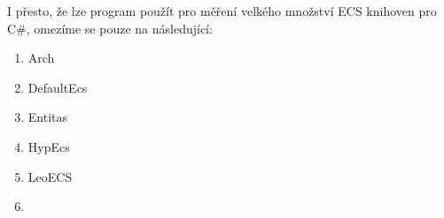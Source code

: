 I přesto, že lze program použít pro měření velkého množství ECS knihoven pro C\#, omezíme se pouze na následující:

\begin{enumerate}
    \item Arch~\cite{Arch}
    \item DefaultEcs~\cite{DefaultEcs}
    \item Entitas~\cite{Entitas}
    \item HypEcs~\cite{HypEcs}
    \item LeoECS~\cite{LeoECS}
    \item {}
\end{enumerate}

\\\\








\\\\
\\\\
\\\\
\\\\
\\\\

